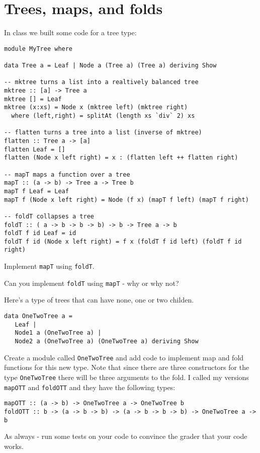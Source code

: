 \documentclass[11pt]{article}
\begin{document}

\section{Trees,  maps, and folds}


In class we built some code for a tree type:

\begin{verbatim}
module MyTree where

data Tree a = Leaf | Node a (Tree a) (Tree a) deriving Show

-- mktree turns a list into a realtively balanced tree
mktree :: [a] -> Tree a
mktree [] = Leaf
mktree (x:xs) = Node x (mktree left) (mktree right)
  where (left,right) = splitAt (length xs `div` 2) xs

-- flatten turns a tree into a list (inverse of mktree)
flatten :: Tree a -> [a]
flatten Leaf = []
flatten (Node x left right) = x : (flatten left ++ flatten right)

-- mapT maps a function over a tree
mapT :: (a -> b) -> Tree a -> Tree b
mapT f Leaf = Leaf
mapT f (Node x left right) = Node (f x) (mapT f left) (mapT f right)

-- foldT collapses a tree
foldT :: ( a -> b -> b -> b) -> b -> Tree a -> b
foldT f id Leaf = id
foldT f id (Node x left right) = f x (foldT f id left) (foldT f id right)
\end{verbatim}

\begin{exercise}
Implement {\tt{mapT}} using {\tt{foldT}}. 
\end{exercise}

\begin{exercise}
Can you implement {\tt{foldT}} using {\tt{mapT}} - why or why not?
\end{exercise}

\begin{exercise}
Here's a  type of trees that can have none, one or two childen.  
\begin{verbatim}
data OneTwoTree a = 
   Leaf | 
   Node1 a (OneTwoTree a) | 
   Node2 a (OneTwoTree a) (OneTwoTree a) deriving Show
\end{verbatim}
Create a module called {\tt{OneTwoTree}} and add code to implement map and fold
functions for this new type.  Note that since there are three constructors for the type {\tt{OneTwoTree}} there will be three arguments to the fold.  I called my versions {\tt{mapOTT}} and {\tt{foldOTT}} and they have the following types:

\begin{verbatim}
mapOTT :: (a -> b) -> OneTwoTree a -> OneTwoTree b
foldOTT :: b -> (a -> b -> b) -> (a -> b -> b -> b) -> OneTwoTree a -> b
\end{verbatim}

As always - run some tests on your code to convince the grader that your code works.




\end{exercise}
\end{document}
